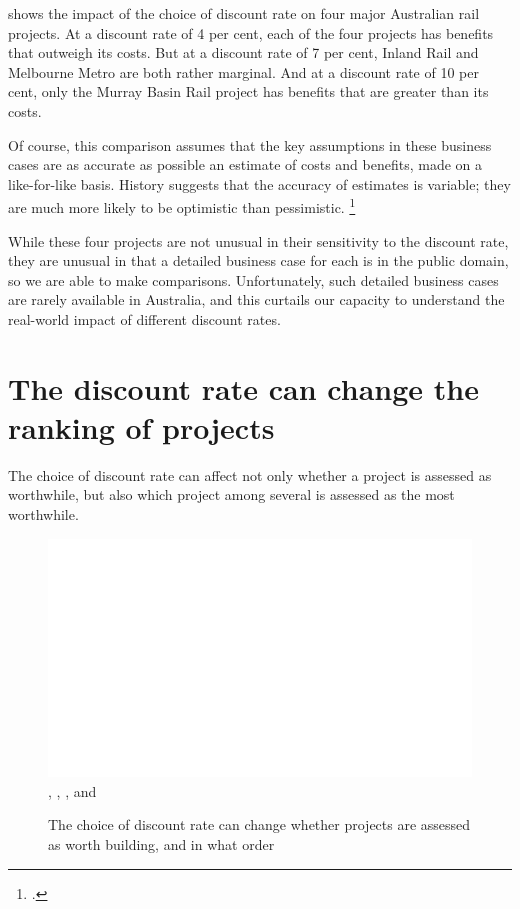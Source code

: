 \documentclass{grattan}
\begin{document}
 shows the impact of the choice of discount rate on four major Australian rail projects. At a discount rate of 4 per cent, each of the four projects has benefits that outweigh its costs. But at a discount rate of 7 per cent, Inland Rail and Melbourne Metro are both rather marginal. And at a discount rate of 10 per cent, only the Murray Basin Rail project has benefits that are greater than its costs.

Of course, this comparison assumes that the key assumptions in these business cases are as accurate as possible an estimate of costs and benefits, made on a like-for-like basis. History suggests that the accuracy of estimates is variable; they are much more likely to be optimistic than pessimistic.%
    \footcite{Terrill-etal-2016-Cost-overruns-in-transport-infrastructure}

While these four projects are not unusual in their sensitivity to the discount rate, they are unusual in that a detailed business case for each is in the public domain, so we are able to make comparisons. Unfortunately, such detailed business cases are rarely available in Australia, and this curtails our capacity to understand the real-world impact of different discount rates.


\section{The discount rate can change the ranking of projects}\label{subsec:artificially-high-DR-may-change-project-rankings} 
The choice of discount rate can affect not only whether a project is assessed as worthwhile, but also which project among several is assessed as the most worthwhile. 

\begin{figure}
\caption{The choice of discount rate can change whether projects are assessed as worth building, and in what order\label{fig:BCRs-using-different-discount-rates}}%
\includegraphics[page=19]{Charts/ChartPackDiscountRates.pdf}
%
{\textcite{CanberraLightRailBusinessCase}, \textcite{Murray-Basin-Business-Case}, \textcite{Government2016MelbourneMetroBusiness}, and \textcite{Inland-Rail-Business-Case}}
\end{figure}
\end{document}
